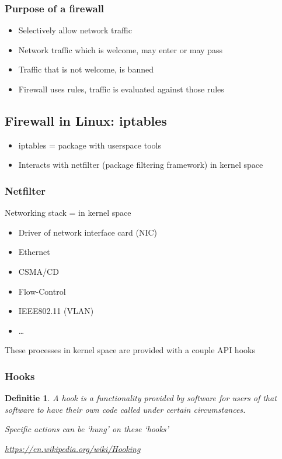 \documentclass{article}
\newtheorem{theorem}{Definitie}[section]
\begin{document}
\subsubsection{Purpose of a firewall}

\begin{itemize}
    \item Selectively allow network traffic
    \item Network traffic which is welcome, may enter or may pass
    \item Traffic that is not welcome, is banned
    \item Firewall uses rules, traffic is evaluated against those rules
\end{itemize}

\subsection{Firewall in Linux: iptables}

\begin{itemize}
    \item iptables = package with userspace tools
    \item Interacts with netfilter (package filtering framework) in kernel space 
\end{itemize}

\subsubsection{Netfilter}

Networking stack = in kernel space

\begin{itemize}
    \item Driver of network interface card (NIC)
    \item Ethernet
    \item CSMA/CD
    \item Flow-Control
    \item IEEE802.11 (VLAN)
    \item \dots
\end{itemize}

These processes in kernel space are provided with a couple API hooks

\subsubsection{Hooks}

\begin{theorem}
    A hook is a functionality provided by software for users of that software
    to have their own code called under certain circumstances.

    Specific actions can be `hung' on these `hooks'

    \url{https://en.wikipedia.org/wiki/Hooking}
\end{theorem}
\end{document}

